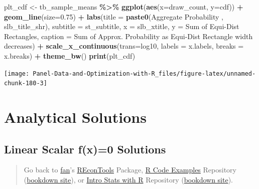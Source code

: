 \documentclass[
]{book}
\newenvironment{Shaded}{\begin{snugshade}}{\end{snugshade}}
\newcommand{\DataTypeTok}[1]{\textcolor[rgb]{0.13,0.29,0.53}{#1}}
\newcommand{\FloatTok}[1]{\textcolor[rgb]{0.00,0.00,0.81}{#1}}
\newcommand{\KeywordTok}[1]{\textcolor[rgb]{0.13,0.29,0.53}{\textbf{#1}}}
\newcommand{\NormalTok}[1]{#1}
\newcommand{\OperatorTok}[1]{\textcolor[rgb]{0.81,0.36,0.00}{\textbf{#1}}}
\newcommand{\StringTok}[1]{\textcolor[rgb]{0.31,0.60,0.02}{#1}}
\begin{document}
\begin{Shaded}
\begin{Highlighting}[]
\NormalTok{plt\_cdf \textless{}{-}}\StringTok{ }\NormalTok{tb\_sample\_means }\OperatorTok{\%\textgreater{}\%}
\StringTok{  }\KeywordTok{ggplot}\NormalTok{(}\KeywordTok{aes}\NormalTok{(}\DataTypeTok{x=}\NormalTok{draw\_count, }\DataTypeTok{y=}\NormalTok{cdf)) }\OperatorTok{+}
\StringTok{  }\KeywordTok{geom\_line}\NormalTok{(}\DataTypeTok{size=}\FloatTok{0.75}\NormalTok{) }\OperatorTok{+}
\StringTok{  }\KeywordTok{labs}\NormalTok{(}\DataTypeTok{title =} \KeywordTok{paste0}\NormalTok{(}\StringTok{\textquotesingle{}Aggregate Probability \textquotesingle{}}\NormalTok{, slb\_title\_shr),}
       \DataTypeTok{subtitle =}\NormalTok{ st\_subtitle,}
       \DataTypeTok{x =}\NormalTok{ slb\_xtitle,}
       \DataTypeTok{y =} \StringTok{\textquotesingle{}Sum of Equi{-}Dist Rectangles\textquotesingle{}}\NormalTok{,}
       \DataTypeTok{caption =} \StringTok{\textquotesingle{}Sum of Approx. Probability as Equi{-}Dist Rectangle width decreases\textquotesingle{}}\NormalTok{) }\OperatorTok{+}
\StringTok{  }\KeywordTok{scale\_x\_continuous}\NormalTok{(}\DataTypeTok{trans=}\StringTok{\textquotesingle{}log10\textquotesingle{}}\NormalTok{, }\DataTypeTok{labels =}\NormalTok{ x.labels, }\DataTypeTok{breaks =}\NormalTok{ x.breaks) }\OperatorTok{+}
\StringTok{  }\KeywordTok{theme\_bw}\NormalTok{()}
\KeywordTok{print}\NormalTok{(plt\_cdf)}
\end{Highlighting}
\end{Shaded}

\begin{center}\texttt{[image: Panel-Data-and-Optimization-with-R\_files/figure-latex/unnamed-chunk-180-3]} \end{center}

\hypertarget{analytical-solutions}{%
\section{Analytical Solutions}\label{analytical-solutions}}

\hypertarget{linear-scalar-fx0-solutions}{%
\subsection{Linear Scalar f(x)=0 Solutions}\label{linear-scalar-fx0-solutions}}

\begin{quote}
Go back to \href{http://fanwangecon.github.io/}{fan}'s \href{https://fanwangecon.github.io/REconTools/}{REconTools} Package, \href{https://fanwangecon.github.io/R4Econ/}{R Code Examples} Repository (\href{https://fanwangecon.github.io/R4Econ/bookdown}{bookdown site}), or \href{https://fanwangecon.github.io/Stat4Econ/}{Intro Stats with R} Repository (\href{https://fanwangecon.github.io/Stat4Econ/bookdown}{bookdown site}).
\end{quote}
\end{document}
